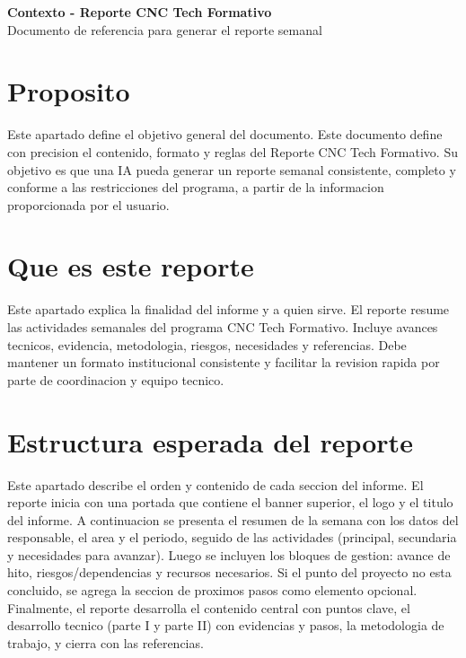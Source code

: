 \documentclass[11pt,a4paper]{article}
\begin{document}
\begin{center}
  {\LARGE \textbf{Contexto - Reporte CNC Tech Formativo}}\\
  \vspace{2mm}
  {\large Documento de referencia para generar el reporte semanal}
\end{center}

\section{Proposito}
Este apartado define el objetivo general del documento. Este documento define
con precision el contenido, formato y reglas del Reporte CNC Tech Formativo.
Su objetivo es que una IA pueda generar un reporte semanal consistente,
completo y conforme a las restricciones del programa, a partir de la
informacion proporcionada por el usuario.

\section{Que es este reporte}
Este apartado explica la finalidad del informe y a quien sirve. El reporte
resume las actividades semanales del programa CNC Tech Formativo. Incluye
avances tecnicos, evidencia, metodologia, riesgos, necesidades y referencias.
Debe mantener un formato institucional consistente y facilitar la revision
rapida por parte de coordinacion y equipo tecnico.

\section{Estructura esperada del reporte}
Este apartado describe el orden y contenido de cada seccion del informe. El
reporte inicia con una portada que contiene el banner superior, el logo y el
titulo del informe. A continuacion se presenta el resumen de la semana con los
datos del responsable, el area y el periodo, seguido de las actividades
(principal, secundaria y necesidades para avanzar). Luego se incluyen los
bloques de gestion: avance de hito, riesgos/dependencias y recursos necesarios.
Si el punto del proyecto no esta concluido, se agrega la seccion de proximos
pasos como elemento opcional. Finalmente, el reporte desarrolla el contenido
central con puntos clave, el desarrollo tecnico (parte I y parte II) con
evidencias y pasos, la metodologia de trabajo, y cierra con las referencias.
\end{document}
